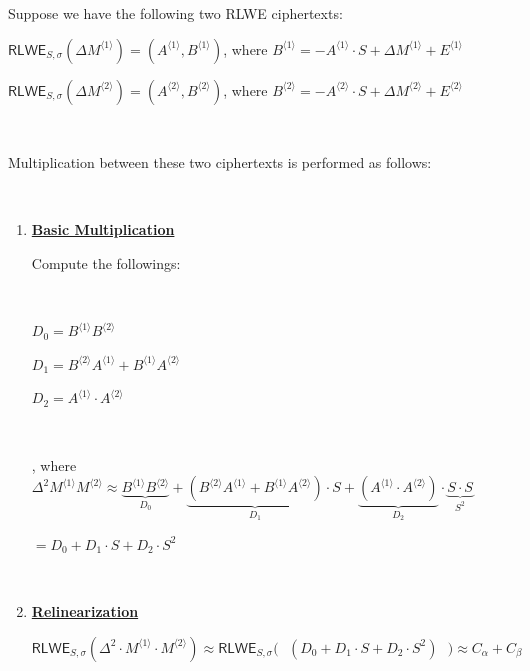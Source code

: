 \begin{tcolorbox}[title={\textbf{\tboxlabel{\ref*{subsubsec:ckks-mult-cipher-summary}} CKKS's Ciphertext-to-Ciphertext Multiplication}}]


Suppose we have the following two RLWE ciphertexts:

$\textsf{RLWE}_{S, \sigma}(\Delta M^{\langle 1 \rangle}) = (A^{\langle 1 \rangle}, B^{\langle 1 \rangle})$, \text{ } where $B^{\langle 1 \rangle} = -A^{\langle 1 \rangle} \cdot S + \Delta M^{\langle 1 \rangle} + E^{\langle 1 \rangle}$

$\textsf{RLWE}_{S, \sigma}(\Delta M^{\langle 2 \rangle}) = (A^{\langle 2 \rangle}, B^{\langle 2 \rangle})$, \text{ } where $B^{\langle 2 \rangle} = -A^{\langle 2 \rangle} \cdot S + \Delta M^{\langle 2 \rangle} + E^{\langle 2 \rangle}$

$ $

Multiplication between these two ciphertexts is performed as follows:

$ $

\begin{enumerate}
\item \textbf{\underline{Basic Multiplication}}

Compute the followings:

$ $

$D_0 = B^{\langle 1 \rangle}B^{\langle 2 \rangle}$

$D_1 = B^{\langle 2 \rangle}A^{\langle 1 \rangle} + B^{\langle 1 \rangle}A^{\langle 2 \rangle}$

$D_2 = A^{\langle 1 \rangle} \cdot A^{\langle 2 \rangle}$

$ $

, where $\Delta^2M^{\langle 1 \rangle}M^{\langle 2 \rangle} \approx \underbrace{B^{\langle 1 \rangle}B^{\langle 2 \rangle}}_{D_0}  + \underbrace{(B^{\langle 2 \rangle}A^{\langle 1 \rangle} + B^{\langle 1 \rangle}A^{\langle 2 \rangle})}_{D_1} \cdot S + \underbrace{(A^{\langle 1 \rangle} \cdot A^{\langle 2 \rangle})}_{D_2} \cdot \underbrace{S \cdot S}_{ S^2}$

$= D_0 + D_1\cdot S + D_2\cdot S^2$

$ $

\item \textbf{\underline{Relinearization}} 

$\textsf{RLWE}_{S, \sigma}(\Delta^2 \cdot M^{\langle 1 \rangle} \cdot M^{\langle 2 \rangle}) \approx \textsf{RLWE}_{S, \sigma}\bm{(}\text{ }(D_0 + D_1\cdot S + D_2\cdot S^2)\text{ }\bm{)} \approx C_\alpha + C_\beta$


\end{enumerate}
\end{tcolorbox}
